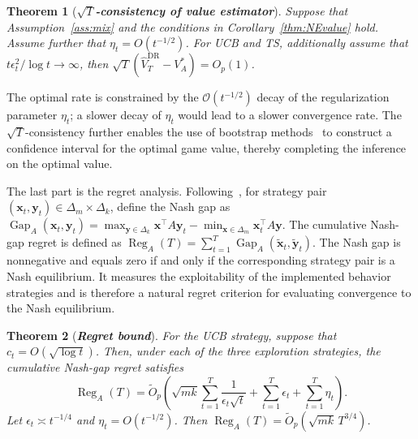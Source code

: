 \documentclass[12pt]{article}
\newtheorem{theorem}{Theorem}
\begin{document}
\begin{theorem}[\textbf{\emph{$\sqrt{T}$-consistency of value estimator}}]
\label{thm:saddlerate}
    Suppose that Assumption~\ref{ass:mix} and the conditions in Corollary~\ref{thm:NEvalue} hold. Assume further that $\eta_t = O(t^{-1/2})$. For UCB and TS, additionally assume that ${t\epsilon_t^2}/{\log t} \to \infty$, then
        $\sqrt{T} \left(\widehat{V}_T^{\text{DR}}- V_A^\ast \right) = O_p(1)$.
\end{theorem}
The optimal rate is constrained by the $\mathcal{O}(t^{-1/2})$ decay of the regularization parameter $\eta_t$; a slower decay of $\eta_t$ would lead to a slower convergence rate. The $\sqrt{T}$-consistency further enables the use of bootstrap methods~\citep{li2025proximal} to construct a confidence interval for the optimal game value, thereby completing the inference on the optimal value.

The last part is the regret analysis. 
Following~\citet{cai2023uncoupled}, for strategy pair $(\bm x_t,\bm y_t)\in\Delta_m\times\Delta_k$, define the Nash gap as $\operatorname{Gap}_A(\bm x_t,\bm y_t)
= \max_{\bm y\in\Delta_k}
\bm x^\top A\bm y_t
- \min_{\bm x\in\Delta_m}
\bm x_t^\top A\bm y$.
The cumulative Nash-gap regret is defined as $\operatorname{Reg}_A(T)
=
\sum_{t=1}^T
\operatorname{Gap}_A
\left(
\widetilde{\bm x}_t,
\widetilde{\bm y}_t
\right)$.
The Nash gap is nonnegative and equals zero if and only if the corresponding strategy pair is a Nash equilibrium. It measures the exploitability of the implemented behavior strategies and is therefore a natural regret criterion for evaluating convergence to the Nash equilibrium. 


\begin{theorem}[\textbf{{\emph{\textbf{Regret bound}}}}]
\label{thm:regret_bandit}
For the UCB strategy, suppose that $c_t = O(\sqrt{\log t})$. Then, under each of the three exploration strategies, the cumulative Nash-gap regret satisfies 
\begin{equation*}
\operatorname{Reg}_A(T)
=
\widetilde O_p
\left(
\sqrt{mk}
\sum_{t=1}^T
\frac{1}{\epsilon_t\sqrt t}
+
\sum_{t=1}^T
\epsilon_t
+
\sum_{t=1}^T
\eta_t
\right).    
\end{equation*}
Let $\epsilon_t\asymp t^{-1/4}$ and $\eta_t = O(t^{-1/2})$. Then
$\operatorname{Reg}_A(T) = \widetilde O_p \left( \sqrt{mk}\,T^{3/4} \right)$.
\end{theorem}
\end{document}
